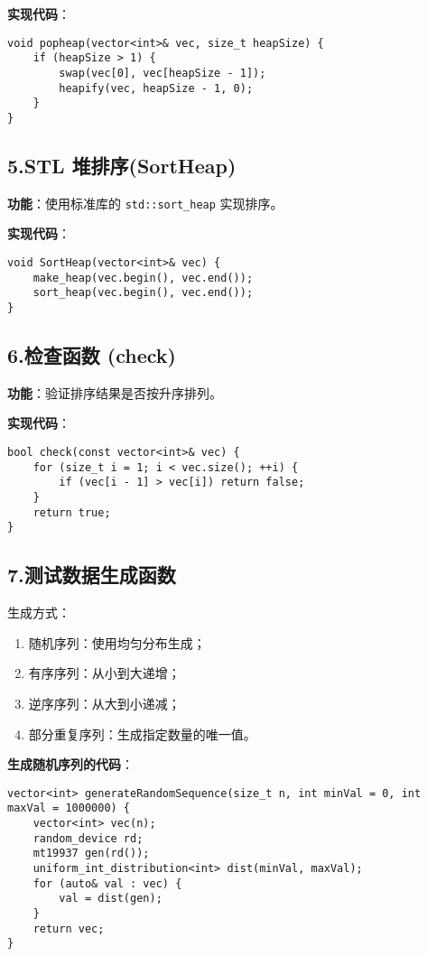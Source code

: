 \documentclass[a4paper]{article}
\begin{document}
\textbf{实现代码}：

\begin{lstlisting}
void popheap(vector<int>& vec, size_t heapSize) {
    if (heapSize > 1) {
        swap(vec[0], vec[heapSize - 1]);
        heapify(vec, heapSize - 1, 0);
    }
}
\end{lstlisting}

\subsection*{5.STL 堆排序(SortHeap)}
\textbf{功能}：使用标准库的 \texttt{std::sort\_heap} 实现排序。

\textbf{实现代码}：
\begin{lstlisting}
void SortHeap(vector<int>& vec) {
    make_heap(vec.begin(), vec.end());
    sort_heap(vec.begin(), vec.end());
}
\end{lstlisting}

\subsection*{6.检查函数 (check)}
\textbf{功能}：验证排序结果是否按升序排列。

\textbf{实现代码}：
\begin{lstlisting}
bool check(const vector<int>& vec) {
    for (size_t i = 1; i < vec.size(); ++i) {
        if (vec[i - 1] > vec[i]) return false;
    }
    return true;
}
\end{lstlisting}

\subsection*{7.测试数据生成函数}
生成方式：
\begin{enumerate}
    \item 随机序列：使用均匀分布生成；
    \item 有序序列：从小到大递增；
    \item 逆序序列：从大到小递减；
    \item 部分重复序列：生成指定数量的唯一值。
\end{enumerate}

\textbf{生成随机序列的代码}：
\begin{lstlisting}
vector<int> generateRandomSequence(size_t n, int minVal = 0, int maxVal = 1000000) {
    vector<int> vec(n);
    random_device rd;
    mt19937 gen(rd());
    uniform_int_distribution<int> dist(minVal, maxVal);
    for (auto& val : vec) {
        val = dist(gen);
    }
    return vec;
}
\end{lstlisting}
\end{document}
